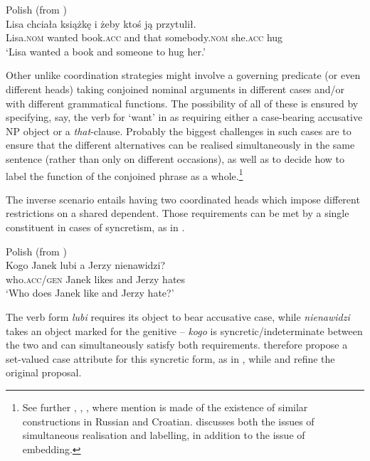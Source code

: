 \documentclass[output=paper,hidelinks]{langscibook}
\begin{document}
\ea%
    \label{ex:Slavic:31}Polish (from \citealt[338]{PatejukPrzepiorkowski2017})\\
    \gll Lisa  chciała   książkę    i      żeby     ktoś       ją              przytulił.\\
       Lisa.\textsc{nom} wanted    book.\textsc{acc}  and    that     somebody.\textsc{nom}   she.\textsc{acc}  hug \\
    \glt `Lisa wanted a book and someone to hug her.' 
    \z

Other unlike coordination strategies might involve a governing predicate (or even different heads) taking conjoined nominal arguments in different cases and/or with different grammatical functions. The possibility of all of these is ensured by specifying, say, the verb for `want' in  as requiring either a case-bearing accusative NP object or a \textit{that}{}-clause. Probably the biggest challenges in such cases are to ensure that the different alternatives can be realised simultaneously in the same sentence (rather than only on different occasions), as well as to decide how to label the function of the conjoined phrase as a whole.\footnote{See further \citet{PatejukPrzepiorkowski2012}, \citet{przepiorkowski-patejuk2012}, \citet[225--230, 617ff., 650--651]{DLM:LFG}, where mention is made of the existence of similar constructions in Russian and Croatian. \citet[54--55, 68ff.]{Patejuk2015} discusses both the issues of simultaneous realisation and labelling, in addition to the issue of embedding.}

The inverse scenario entails having two coordinated heads which impose different restrictions on a shared dependent. Those requirements can be met by a single constituent in cases of syncretism, as in .

\ea%
    \label{ex:Slavic:32}Polish (from \citealt[ex.~2]{Dyla1984})\\
    \gll Kogo     Janek  lubi   a   Jerzy   nienawidzi?\\
        who.\textsc{acc/gen}   Janek   likes   and   Jerzy   hates \\
    \glt `Who does Janek like and Jerzy hate?'   
    \z


The verb form \textit{lubi} requires its object to bear accusative case, while \textit{nienawidzi} takes an object marked for the genitive -- \textit{kogo} is syncretic/indeterminate between the two and can simultaneously satisfy both requirements. \citet{DalrympleKaplan2000} therefore propose a set-valued case attribute for this syncretic form, as in , while \citet{PatejukPrzepiorkowski2014a} and \citet[41ff.]{Patejuk2015} refine the original proposal.
\end{document}

